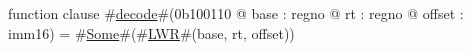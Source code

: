 function clause #\hyperref[zdecode]{decode}#(0b100110 @ base : regno @ rt : regno @ offset : imm16) =
      #\hyperref[zSome]{Some}#(#\hyperref[zLWR]{LWR}#(base, rt, offset))
